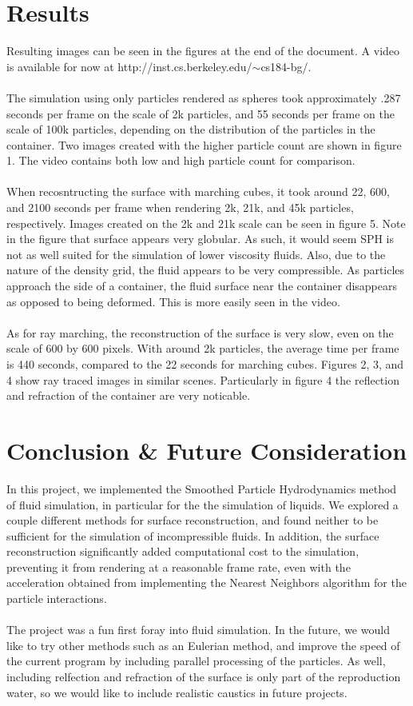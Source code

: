 \documentclass[11pt]{article}
\begin{document}
\section*{Results}
Resulting images can be seen in the figures at the end of the document.  A video is available for now at http://inst.cs.berkeley.edu/$\sim$cs184-bg/.
\\ \\
The simulation using only particles rendered as spheres took approximately .287 seconds per frame on the scale of 2k particles, and 55 seconds per frame on the scale of 100k particles, depending on the distribution of the particles in the container. Two images created with the higher particle count are shown in figure 1. The video contains both low and high particle count for comparison. 
\\ \\
When recosntructing the surface with marching cubes, it took around 22, 600, and 2100 seconds per frame when rendering 2k, 21k, and 45k particles, respectively. Images created on the 2k and 21k scale can be seen in figure 5. Note in the figure that surface appears very globular. As such, it would seem SPH is not as well suited for the simulation of lower viscosity fluids. Also, due to the nature of the density grid, the fluid appears to be very compressible. As particles approach the side of a container, the fluid surface near the container disappears as opposed to being deformed. This is more easily seen in the video.
\\ \\
As for ray marching, the reconstruction of the surface is very slow, even on the scale of 600 by 600 pixels. With around 2k particles, the average time per frame is 440 seconds, compared to the 22 seconds for marching cubes. Figures 2, 3, and 4 show ray traced images in similar scenes. Particularly in figure 4 the reflection and refraction of the container are very noticable.

\section*{Conclusion \& Future Consideration}
In this project, we implemented the Smoothed Particle Hydrodynamics method of fluid simulation, in particular for the the simulation of liquids. We explored a couple different methods for surface reconstruction, and found neither to be sufficient for the simulation of incompressible fluids. In addition, the surface reconstruction significantly added computational cost to the simulation, preventing it from rendering at a reasonable frame rate, even with the acceleration obtained from implementing the Nearest Neighbors algorithm for the particle interactions.
\\ \\
The project was a fun first foray into fluid simulation. In the future, we would like to try other methods such as an Eulerian method, and improve the speed of the current program by including parallel processing of the particles. As well, including relfection and refraction of the surface is only part of the reproduction water, so we would like to include realistic caustics in future projects.
\end{document}

